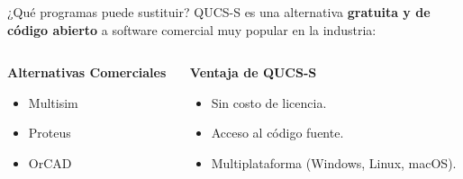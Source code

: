 \documentclass{beamer}
\begin{document}
\begin{frame}{¿Qué programas puede sustituir?}
  QUCS-S es una alternativa \textbf{gratuita y de código abierto} a software comercial muy popular en la industria:
  \begin{columns}
    \begin{column}{0.5\textwidth}
      \begin{center}
        \textbf{Alternativas Comerciales}
        \begin{itemize}
          \item Multisim
          \item Proteus
          \item OrCAD
        \end{itemize}
      \end{center}
    \end{column}
    \begin{column}{0.5\textwidth}
      \begin{center}
        \textbf{Ventaja de QUCS-S}
        \begin{itemize}
          \item Sin costo de licencia.
          \item Acceso al código fuente.
          \item Multiplataforma (Windows, Linux, macOS).
        \end{itemize}
      \end{center}
    \end{column}
  \end{columns}
\end{frame}
\end{document}
